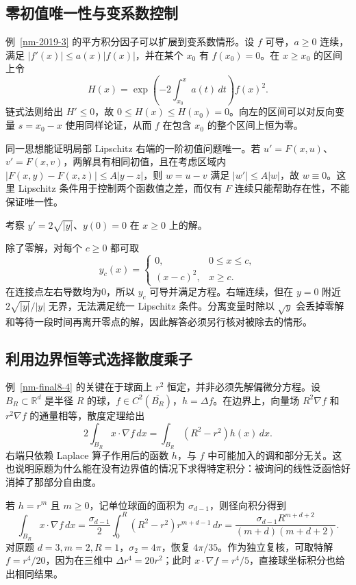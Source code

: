 \documentclass[UTF8,12pt,a4paper,fontset=fandol]{ctexart}
\begin{document}
\subsection{零初值唯一性与变系数控制}
例~\ref{nm-2019-3} 的平方积分因子可以扩展到变系数情形。设 $f$ 可导，$a\geq0$ 连续，满足 $|f'(x)|\leq a(x)|f(x)|$，并在某个 $x_0$ 有 $f(x_0)=0$。在 $x\geq x_0$ 的区间上令
\[
 H(x)=\exp\left(-2\int_{x_0}^xa(t)\,dt\right)f(x)^2.
\]
链式法则给出 $H'\leq0$，故 $0\leq H(x)\leq H(x_0)=0$。向左的区间可以对反向变量 $s=x_0-x$ 使用同样论证，从而 $f$ 在包含 $x_0$ 的整个区间上恒为零。

同一思想能证明局部 Lipschitz 右端的一阶初值问题唯一。若 $u'=F(x,u)$、$v'=F(x,v)$，两解具有相同初值，且在考虑区域内 $|F(x,y)-F(x,z)|\leq A|y-z|$，则 $w=u-v$ 满足 $|w'|\leq A|w|$，故 $w\equiv0$。这里 Lipschitz 条件用于控制两个函数值之差，而仅有 $F$ 连续只能帮助存在性，不能保证唯一性。

\begin{example}
考察 $y'=2\sqrt{|y|}$、$y(0)=0$ 在 $x\geq0$ 上的解。
\end{example}
\begin{solve}
除了零解，对每个 $c\geq0$ 都可取
\[
 y_c(x)=\begin{cases}0,&0\leq x\leq c,\\(x-c)^2,&x\geq c.\end{cases}
\]
在连接点左右导数均为0，所以 $y_c$ 可导并满足方程。右端连续，但在 $y=0$ 附近 $2\sqrt{|y|}/|y|$ 无界，无法满足统一 Lipschitz 条件。分离变量时除以 $\sqrt y$ 会丢掉零解和等待一段时间再离开零点的解，因此解答必须另行核对被除去的情形。
\end{solve}

\subsection{利用边界恒等式选择散度乘子}
例~\ref{nm-final8-4} 的关键在于球面上 $r^2$ 恒定，并非必须先解偏微分方程。设 $B_R\subset\mathbb R^d$ 是半径 $R$ 的球，$f\in C^2(\overline{B_R})$，$h=\Delta f$。在边界上，向量场 $R^2\nabla f$ 和 $r^2\nabla f$ 的通量相等，散度定理给出
\[
 2\int_{B_R}x\cdot\nabla f\,dx
 =\int_{B_R}(R^2-r^2)h(x)\,dx.
\]
右端只依赖 Laplace 算子作用后的函数 $h$，与 $f$ 中可能加入的调和部分无关。这也说明原题为什么能在没有边界值的情况下求得特定积分：被询问的线性泛函恰好消掉了那部分自由度。

若 $h=r^m$ 且 $m\geq0$，记单位球面的面积为 $\sigma_{d-1}$，则径向积分得到
\[
 \int_{B_R}x\cdot\nabla f\,dx
 =\frac{\sigma_{d-1}}2\int_0^R(R^2-r^2)r^{m+d-1}\,dr
 =\frac{\sigma_{d-1}R^{m+d+2}}{(m+d)(m+d+2)}.
\]
对原题 $d=3,m=2,R=1$，$\sigma_2=4\pi$，恢复 $4\pi/35$。作为独立复核，可取特解 $f=r^4/20$，因为在三维中 $\Delta r^4=20r^2$；此时 $x\cdot\nabla f=r^4/5$，直接球坐标积分也给出相同结果。
\end{document}
